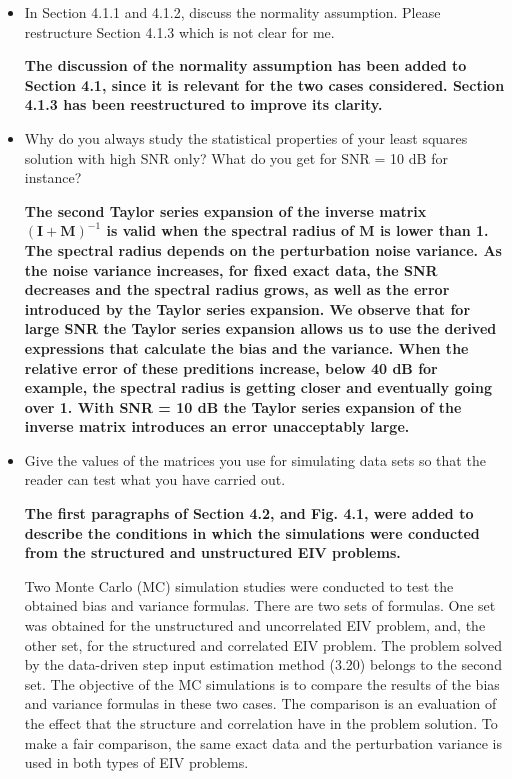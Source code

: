 \documentclass[11pt]{article}
\begin{document}
\begin{itemize}
    \item  In Section 4.1.1 and 4.1.2, discuss the normality assumption. Please restructure Section 4.1.3 which is not clear for me. 
    
    {\bfseries The discussion of the normality assumption has been added to Section 4.1, since it is relevant for the two cases considered. Section 4.1.3 has been reestructured to improve its clarity.}
    
    \item  Why do you always study the statistical properties of your least squares solution with high SNR only? What do you get for SNR = 10 dB for instance? 
    
    {\bfseries The second Taylor series expansion of the inverse matrix $(\mathbf{I} + \mathbf{M})^{-1}$ is valid when the spectral radius of $\mathbf{M}$ is lower than 1. The spectral radius depends on the perturbation noise variance. As the noise variance increases, for fixed exact data, the SNR decreases and the spectral radius grows, as well as the error introduced by the Taylor series expansion. We observe that for large SNR the Taylor series expansion allows us to use the derived expressions that calculate the bias and the variance. When the relative error of these preditions increase, below 40 dB for example, the spectral radius is getting closer and eventually going over 1. With SNR = 10 dB the Taylor series expansion of the inverse matrix introduces an error unacceptably large. }
    
    \item Give the values of the matrices you use for simulating data sets so that the reader can test what you have carried out. 
    
    {\bfseries The first paragraphs of Section 4.2, and Fig. 4.1, were added to describe the conditions in which the simulations were conducted from the structured and unstructured EIV problems.}

    \color{blue}
    Two Monte Carlo (MC) simulation studies were conducted to test the obtained bias and variance formulas.
    There are two sets of formulas.
    One set was obtained for the unstructured and uncorrelated EIV problem, and, the other set, for the structured and correlated EIV problem. 
    The problem solved by the data-driven step input estimation method (3.20) belongs to the second set.
    The objective of the MC simulations is to compare the results of the bias and variance formulas in these two cases. 
    The comparison is an evaluation of the effect that the structure and correlation have in the problem solution.
    To make a fair comparison, the same exact data and the perturbation variance is used in both types of EIV problems. 


\end{itemize}
\end{document}
